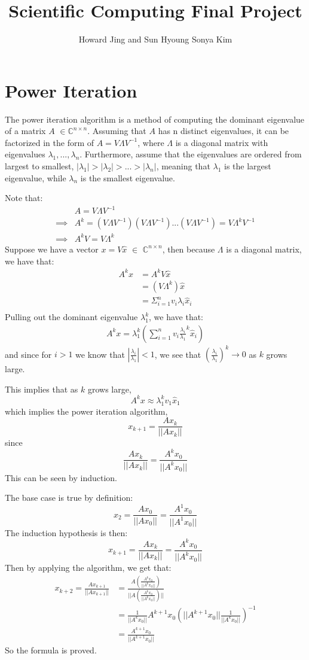 \documentclass[11pt]{amsart}
\title{Scientific Computing Final Project}
\author{Howard Jing and Sun Hyoung Sonya Kim}
\begin{document}
\maketitle
\section*{Power Iteration}
The power iteration algorithm is a method of computing the dominant eigenvalue of a matrix $A$ $\in \mathbb{C}^{n \times n}$. Assuming that $A$ has n distinct eigenvalues, it can be factorized in the form of $A = V \Lambda V^{-1}$, where $\Lambda$ is a diagonal matrix with eigenvalues $\lambda_1 ,..., \lambda_n$. Furthermore, assume that the eigenvalues are ordered from largest to smallest, $|\lambda_1| > |\lambda_2| > ... > |\lambda_n|$, meaning that $\lambda_1$ is the largest eigenvalue, while $\lambda_n$ is the smallest eigenvalue.

Note that: 
\begin{align*}
	&A = V\Lambda V^{-1} \\
	\implies &A^k = (V\Lambda V^{-1})(V\Lambda V^{-1})...(V\Lambda V^{-1}) = V\Lambda ^k V^{-1} \\	
	\implies &A^kV = V\Lambda ^k
\end{align*}
Suppose we have a vector $x = V \hat{x} $ $\in$ $\mathbb{C}^{n \times n}$, then because $\Lambda$ is a diagonal matrix, we have that:
\begin{align*}
	A^kx &= A^kV\hat{x} \\
	& = (V\Lambda ^k)\hat{x}  \\
	& = \Sigma^{n}_{i=1} v_i \lambda_i \hat{x}_i \\
\end{align*}
Pulling out the dominant eigenvalue $\lambda_1^k$, we have that:
\begin{align*}
	A^kx = \lambda_1^k(\sum_{i=1}^n v_i \frac{\lambda_i}{\lambda_1}^k \hat{x}_i)
\end{align*}
and since for $i > 1$ we know that $|\frac{\lambda_i}{\lambda_1}| < 1$, we see that $(\frac{\lambda_i}{\lambda_1})^k \rightarrow 0$ as $k$ grows large.

This implies that as $k$ grows large, 
\[ 
	A^k x \approx \lambda_1^k v_1 \hat{x}_1
\]
which implies the power iteration algorithm,
\[
	x_{k+1} = \frac{Ax_k}{||Ax_k||}
\]
since
\[
	\frac{Ax_k}{||Ax_k||} = \frac{A^kx_0}{||A^kx_0||}
\]
This can be seen by induction.

The base case is true by definition:
\[
	x_2 = \frac{Ax_0}{||Ax_0||} = \frac{A^1x_0}{||A^1x_0||}
\]
The induction hypothesis is then:
\[
	x_{k+1} = \frac{Ax_k}{||Ax_k||} = \frac{A^kx_0}{||A^kx_0||}
\]
Then by applying the algorithm, we get that:
\begin{align*}
	x_{k+2} = \frac{Ax_{k+1}}{||Ax_{k+1}||} &= \frac{A(\frac{A^kx_0}{||A^kx_0||})}{||A(\frac{A^kx_0}{||A^kx_0||})||}\\
	&= \frac{1}{||A^kx_0||}A^{k+1}x_0(||A^{k+1}x_0||\frac{1}{||A^kx_0||})^{-1} \\
	&=\frac{A^{k+1}x_0}{||A^{k+1}x_0||}
\end{align*}
So the formula is proved. 
\end{document}
